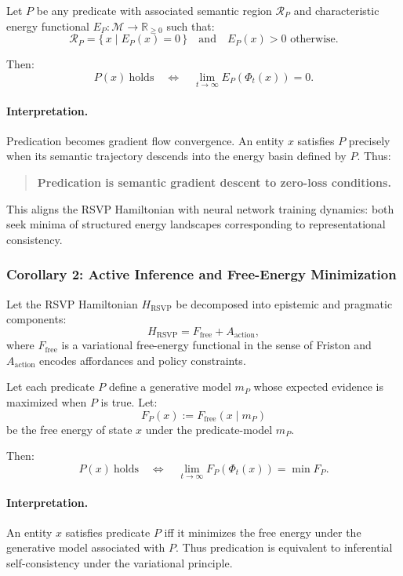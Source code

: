 \documentclass[12pt,letterpaper]{article}
\begin{document}
Let $P$ be any predicate with associated semantic region $\mathcal{R}_P$ and
characteristic energy functional $E_P : \mathcal{M} \to \mathbb{R}_{\ge 0}$ such that:
\[
\mathcal{R}_P = \{\,x \mid E_P(x) = 0 \,\}
\quad\text{and}\quad 
E_P(x) > 0 \text{ otherwise}.
\]

Then:
\[
P(x)\ \text{holds}
\quad\Longleftrightarrow\quad
\lim_{t\to\infty} E_P(\Phi_t(x)) = 0.
\]

\paragraph{Interpretation.}
Predication becomes gradient flow convergence.  
An entity $x$ satisfies $P$ precisely when its semantic trajectory descends into
the energy basin defined by $P$.  
Thus:

\begin{quote}
\textbf{Predication is semantic gradient descent to zero-loss conditions.}
\end{quote}

This aligns the RSVP Hamiltonian with neural network training dynamics: both
seek minima of structured energy landscapes corresponding to representational
consistency.

\subsubsection*{Corollary 2: Active Inference and Free-Energy Minimization}

Let the RSVP Hamiltonian $H_{\mathrm{RSVP}}$ be decomposed into epistemic and
pragmatic components:
\[
H_{\mathrm{RSVP}} = F_{\mathrm{free}} + A_{\mathrm{action}},
\]
where $F_{\mathrm{free}}$ is a variational free-energy functional in the sense of
Friston and $A_{\mathrm{action}}$ encodes affordances and policy constraints.

Let each predicate $P$ define a generative model $m_P$ whose expected evidence is
maximized when $P$ is true.  Let:
\[
F_P(x) := F_{\mathrm{free}}(x \mid m_P)
\]
be the free energy of state $x$ under the predicate-model $m_P$.

Then:
\[
P(x)\ \text{holds}
\quad\Longleftrightarrow\quad
\lim_{t\to\infty} F_P(\Phi_t(x)) = \min F_P.
\]

\paragraph{Interpretation.}
An entity $x$ satisfies predicate $P$ iff it minimizes the free energy under the
generative model associated with $P$.  Thus predication is equivalent to
inferential self-consistency under the variational principle.
\end{document}
